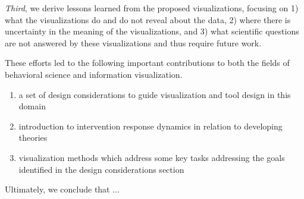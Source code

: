 \textit{Third}, we derive lessons learned from the proposed visualizations, focusing on 1) what the visualizations do and do not reveal about the data, 2) where there is uncertainty in the meaning of the visualizations, and 3) what scientific questions are not answered by these visualizations and thus require future work.

These efforts led to the following important contributions to both the fields of behavioral science and information visualization.

\begin{enumerate}
	\item{a set of design considerations to guide visualization and tool design in this domain}
	\item{introduction to intervention response dynamics in relation to developing theories}
	\item{visualization methods which address some key tasks addressing the goals identified in the design considerations section}
\end{enumerate}

Ultimately, we conclude that ... %

